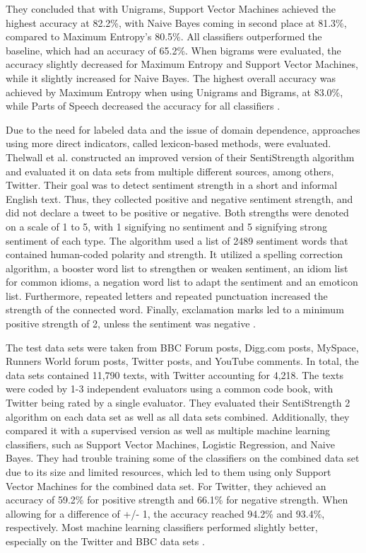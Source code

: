 They concluded that with Unigrams, Support Vector Machines achieved the highest accuracy at 82.2\%, with Naive Bayes coming in second place at 81.3\%, compared to Maximum Entropy's 80.5\%. All classifiers outperformed the baseline, which had an accuracy of 65.2\%. When bigrams were evaluated, the accuracy slightly decreased for Maximum Entropy and Support Vector Machines, while it slightly increased for Naive Bayes. The highest overall accuracy was achieved by Maximum Entropy when using Unigrams and Bigrams, at 83.0\%, while Parts of Speech decreased the accuracy for all classifiers \cite{GoBHaHua2009}. 

Due to the need for labeled data and the issue of domain dependence, approaches using more direct indicators, called lexicon-based methods, were evaluated. Thelwall et al. constructed an improved version of their SentiStrength algorithm and evaluated it on data sets from multiple different sources, among others, Twitter. Their goal was to detect sentiment strength in a short and informal English text. Thus, they collected positive and negative sentiment strength, and did not declare a tweet to be positive or negative. Both strengths were denoted on a scale of 1 to 5, with 1 signifying no sentiment and 5 signifying strong sentiment of each type. The algorithm used a list of 2489 sentiment words that contained human-coded polarity and strength. It utilized a spelling correction algorithm, a booster word list to strengthen or weaken sentiment, an idiom list for common idioms, a negation word list to adapt the sentiment and an emoticon list. Furthermore, repeated letters and repeated punctuation increased the strength of the connected word. Finally, exclamation marks led to a minimum positive strength of 2, unless the sentiment was negative \cite{10.1002/asi.21662}.

The test data sets were taken from BBC Forum posts, Digg.com posts, MySpace, Runners World forum posts, Twitter posts, and YouTube comments. In total, the data sets contained 11,790 texts, with Twitter accounting for 4,218. The texts were coded by 1-3 independent evaluators using a common code book, with Twitter being rated by a single evaluator. They evaluated their SentiStrength 2 algorithm on each data set as well as all data sets combined. Additionally, they compared it with a supervised version as well as multiple machine learning classifiers, such as Support Vector Machines, Logistic Regression, and Naive Bayes. They had trouble training some of the classifiers on the combined data set due to its size and limited resources, which led to them using only Support Vector Machines for the combined data set. For Twitter, they achieved an accuracy of 59.2\% for positive strength and 66.1\% for negative strength. When allowing for a difference of +/- 1, the accuracy reached 94.2\% and 93.4\%, respectively. Most machine learning classifiers performed slightly better, especially on the Twitter and BBC data sets \cite{10.1002/asi.21662}.

